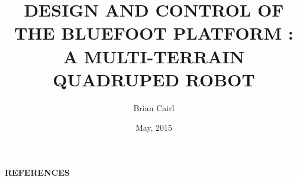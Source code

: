 





\renewcommand{\baselinestretch}{1.6}
\newtheorem{theorem}{Theorem}[chapter]
\newcommand{\btheorem}{\begin{theorem}\rm}
\newcommand{\etheorem}{$\diamond$\end{theorem}}
\newtheorem{definition}{Definition}[chapter]
\newcommand{\bdefn}{\begin{definition}\rm}
\newcommand{\edefn}{\end{definition}}
\newtheorem{lemma}{Lemma}[chapter]
\newtheorem{remark}{Remark}[chapter]
\newcommand{\bremark}{\begin{remark}\rm}
\newcommand{\eremark}{\end{remark}}
\newtheorem{example}{Example}[chapter]
\newcommand{\bexample}{\begin{example}\rm}
\newcommand{\eexample}{\end{example}}
\newtheorem{assumption}{Assumption}[chapter]
\newcommand{\bassump}{\begin{assumption}\rm}
\newcommand{\eassump}{\end{assumption}}

\title{DESIGN AND CONTROL OF THE BLUEFOOT PLATFORM :\\A MULTI-TERRAIN QUADRUPED ROBOT}
\author{Brian Cairl}
\date{May, 2015}
\mstitlepage
\topmargin=0.4in
\textwidth=6.0in
\textheight=9.0in





\setcounter{page}{1}






\normalsize
\tableofcontents
\listoffigures
\listoftables
\newpage
\setcounter{page}{1}
	
	
	
	
	
	
	
	\begin{appendices}
		
		
		
	\end{appendices}
{\newpage
	{\begin{center}{\textbf{REFERENCES}}\end{center}}


}


